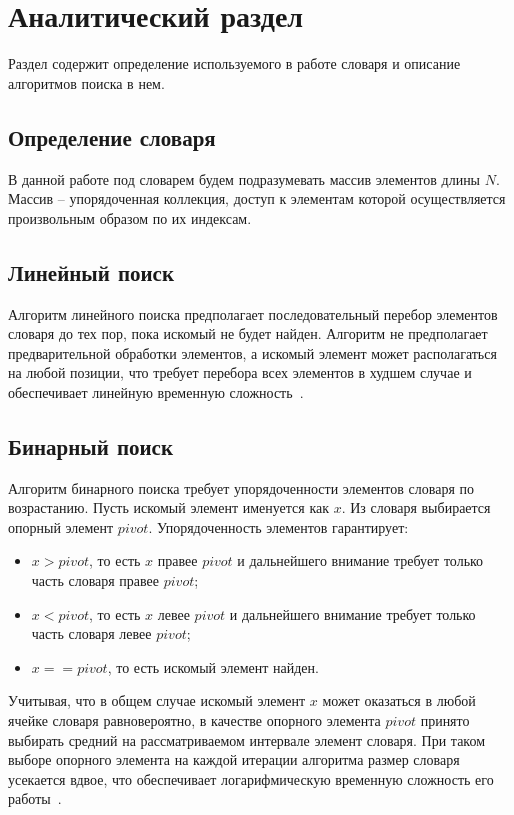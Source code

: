 \chapter{Аналитический раздел}

Раздел содержит определение используемого в работе словаря и описание алгоритмов поиска в нем.

\section{Определение словаря}
\label{chap:dict}
В данной работе под словарем будем подразумевать массив элементов длины $N$. Массив -- упорядоченная коллекция, доступ к элементам которой осуществляется произвольным образом по их индексам.

\section{Линейный поиск}
\label{chap:linear_search}
Алгоритм линейного поиска предполагает последовательный перебор элементов словаря до тех пор, пока искомый не будет найден. Алгоритм не предполагает предварительной обработки элементов, а искомый элемент может располагаться на любой позиции, что требует перебора всех элементов в худшем случае и обеспечивает линейную временную сложность~\cite{book_skiena}.

\section{Бинарный поиск}
Алгоритм бинарного поиска требует упорядоченности элементов словаря по возрастанию. Пусть искомый элемент именуется как $x$. Из словаря выбирается опорный элемент $pivot$. Упорядоченность элементов гарантирует:
\begin{itemize}[label=--]
    \item $x > pivot$, то есть $x$ правее $pivot$ и дальнейшего внимание требует только часть словаря правее $pivot$;
    \item $x < pivot$, то есть $x$ левее $pivot$ и дальнейшего внимание требует только часть словаря левее $pivot$;
    \item $x == pivot$, то есть искомый элемент найден.
\end{itemize}
Учитывая, что в общем случае искомый элемент $x$ может оказаться в любой ячейке словаря равновероятно, в качестве опорного элемента $pivot$ принято выбирать средний на рассматриваемом интервале элемент словаря. При таком выборе опорного элемента на каждой итерации алгоритма размер словаря усекается вдвое, что обеспечивает логарифмическую временную сложность его работы~\cite{book_skiena}. 

